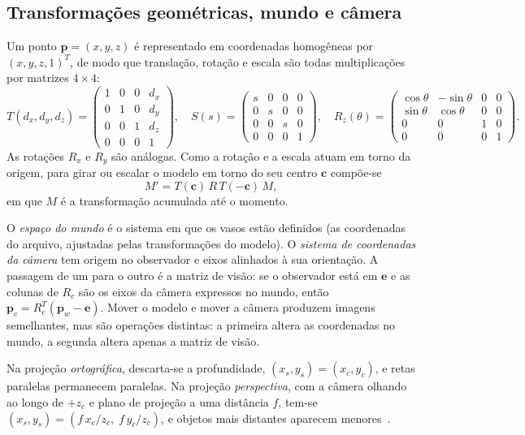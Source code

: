 \documentclass[11pt, a4paper]{article}
\begin{document}
\subsection{Transformações geométricas, mundo e câmera}
Um ponto $\mathbf{p}=(x,y,z)$ é representado em coordenadas homogêneas por $(x,y,z,1)^{T}$, de modo que translação, rotação e escala são todas multiplicações por matrizes $4\times4$:
\begin{equation}
  T(d_x,d_y,d_z)=\begin{pmatrix}1&0&0&d_x\\0&1&0&d_y\\0&0&1&d_z\\0&0&0&1\end{pmatrix},\quad
  S(s)=\begin{pmatrix}s&0&0&0\\0&s&0&0\\0&0&s&0\\0&0&0&1\end{pmatrix},\quad
  R_z(\theta)=\begin{pmatrix}\cos\theta&-\sin\theta&0&0\\\sin\theta&\cos\theta&0&0\\0&0&1&0\\0&0&0&1\end{pmatrix}.
  \label{eq:matrizes}
\end{equation}
As rotações $R_x$ e $R_y$ são análogas. Como a rotação e a escala atuam em torno da origem, para girar ou escalar o modelo em torno do seu centro $\mathbf{c}$ compõe-se
\begin{equation}
  M' = T(\mathbf{c})\,R\,T(-\mathbf{c})\,M,
  \label{eq:centro}
\end{equation}
em que $M$ é a transformação acumulada até o momento.

O \emph{espaço do mundo} é o sistema em que os vasos estão definidos (as coordenadas do arquivo, ajustadas pelas transformações do modelo). O \emph{sistema de coordenadas da câmera} tem origem no observador e eixos alinhados à sua orientação. A passagem de um para o outro é a matriz de visão: se o observador está em $\mathbf{e}$ e as colunas de $R_c$ são os eixos da câmera expressos no mundo, então $\mathbf{p}_c=R_c^{T}(\mathbf{p}_w-\mathbf{e})$. Mover o modelo e mover a câmera produzem imagens semelhantes, mas são operações distintas: a primeira altera as coordenadas no mundo, a segunda altera apenas a matriz de visão.

Na projeção \emph{ortográfica}, descarta-se a profundidade, $(x_s,y_s)=(x_c,y_c)$, e retas paralelas permanecem paralelas. Na projeção \emph{perspectiva}, com a câmera olhando ao longo de $+z_c$ e plano de projeção a uma distância $f$, tem-se $(x_s,y_s)=(f\,x_c/z_c,\;f\,y_c/z_c)$, e objetos mais distantes aparecem menores~\cite{hughes2013}.
\end{document}
